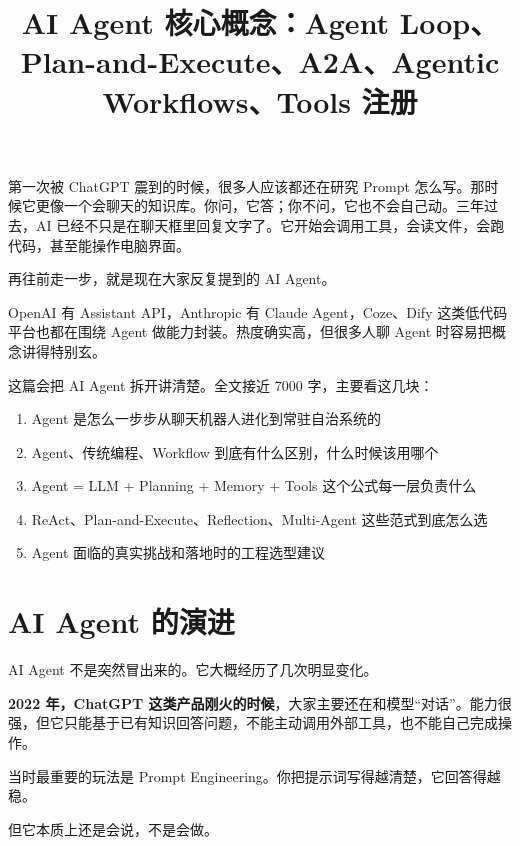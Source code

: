 \documentclass[10pt,a4paper]{ctexart}
\begin{document}
\title{AI Agent 核心概念：Agent Loop、Plan-and-Execute、A2A、Agentic Workflows、Tools 注册}
\date{}
\maketitle

第一次被 ChatGPT 震到的时候，很多人应该都还在研究 Prompt 怎么写。那时候它更像一个会聊天的知识库。你问，它答；你不问，它也不会自己动。三年过去，AI 已经不只是在聊天框里回复文字了。它开始会调用工具，会读文件，会跑代码，甚至能操作电脑界面。



再往前走一步，就是现在大家反复提到的 AI Agent。



OpenAI 有 Assistant API，Anthropic 有 Claude Agent，Coze、Dify 这类低代码平台也都在围绕 Agent 做能力封装。热度确实高，但很多人聊 Agent 时容易把概念讲得特别玄。



这篇会把 AI Agent 拆开讲清楚。全文接近 7000 字，主要看这几块：


\begin{enumerate}[itemsep=2pt, topsep=4pt]
  \item Agent 是怎么一步步从聊天机器人进化到常驻自治系统的
  \item Agent、传统编程、Workflow 到底有什么区别，什么时候该用哪个
  \item Agent = LLM + Planning + Memory + Tools 这个公式每一层负责什么
  \item ReAct、Plan-and-Execute、Reflection、Multi-Agent 这些范式到底怎么选
  \item Agent 面临的真实挑战和落地时的工程选型建议
\end{enumerate}


\section{AI Agent 的演进}


AI Agent 不是突然冒出来的。它大概经历了几次明显变化。



\textbf{2022 年，ChatGPT 这类产品刚火的时候}，大家主要还在和模型“对话”。能力很强，但它只能基于已有知识回答问题，不能主动调用外部工具，也不能自己完成操作。



当时最重要的玩法是 Prompt Engineering。你把提示词写得越清楚，它回答得越稳。



但它本质上还是会说，不是会做。
\end{document}
